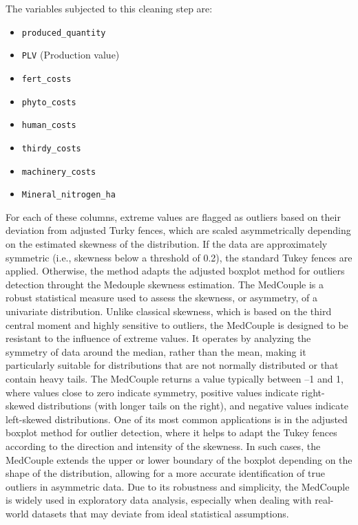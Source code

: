 \documentclass[11pt,a4paper]{article}
\begin{document}
The variables subjected to this cleaning step are:

\begin{itemize}
    \item \texttt{produced\_quantity}
    \item \texttt{PLV} (Production value)
    \item \texttt{fert\_costs}
    \item \texttt{phyto\_costs}
    \item \texttt{human\_costs}
    \item \texttt{thirdy\_costs}
    \item \texttt{machinery\_costs}
    \item \texttt{Mineral\_nitrogen\_ha}
\end{itemize}

For each of these columns, extreme values are flagged as outliers based on their deviation from adjusted Turky fences, which are scaled asymmetrically depending on the estimated skewness of the distribution.
If the data are approximately symmetric (i.e., skewness below a threshold of 0.2), the standard Tukey fences are applied. Otherwise, the method adapts the adjusted boxplot method for outliers detection throught the Medouple skewness estimation.
The MedCouple is a robust statistical measure used to assess the skewness, or asymmetry, of a univariate distribution. Unlike classical skewness, which is based on the third central moment and highly sensitive to outliers, the MedCouple is designed to be resistant to the influence of extreme values. It operates by analyzing the symmetry of data around the median, rather than the mean, making it particularly suitable for distributions that are not normally distributed or that contain heavy tails. The MedCouple returns a value typically between –1 and 1, where values close to zero indicate symmetry, positive values indicate right-skewed distributions (with longer tails on the right), and negative values indicate left-skewed distributions. One of its most common applications is in the adjusted boxplot method for outlier detection, where it helps to adapt the Tukey fences according to the direction and intensity of the skewness. In such cases, the MedCouple extends the upper or lower boundary of the boxplot depending on the shape of the distribution, allowing for a more accurate identification of true outliers in asymmetric data. Due to its robustness and simplicity, the MedCouple is widely used in exploratory data analysis, especially when dealing with real-world datasets that may deviate from ideal statistical assumptions.
\end{document}
